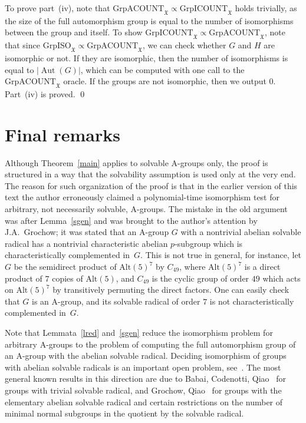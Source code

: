 \documentclass{article}
\DeclareMathOperator{\Aut}{Aut}
\newcommand{\X}{\mathfrak{X}}
\begin{document}
To prove part~(iv), note that \( \mathrm{GrpACOUNT}_\X \propto \mathrm{GrpICOUNT}_\X \) holds trivially,
as the size of the full automorphism group is equal to the number of isomorphisms between the group and itself.
To show \( \mathrm{GrpICOUNT}_\X \propto \mathrm{GrpACOUNT}_\X \), note that since \( \mathrm{GrpISO}_\X \propto \mathrm{GrpACOUNT}_\X \),
we can check whether \( G \) and \( H \) are isomorphic or not. If they are isomorphic, then the number of isomorphisms
is equal to \( |\Aut(G)| \), which can be computed with one call to the \( \mathrm{GrpACOUNT}_\X \) oracle. If the groups are not isomorphic,
then we output \( 0 \). Part~(iv) is proved. \qed

\section{Final remarks}\label{secFinal}

Although Theorem~\ref{main} applies to solvable A-groups only, the proof is structured in a way that the solvability assumption
is used only at the very end. The reason for such organization of the proof is that in the earlier version of this text the author erroneously
claimed a polynomial-time isomorphism test for arbitrary, not necessarily solvable, A-groups. The mistake in the old argument was after Lemma~\ref{sgen}
and was brought to the author's attention by J.A.~Grochow; it was stated that an A-group \( G \) with a nontrivial abelian solvable radical has
a nontrivial characteristic abelian \( p \)-subgroup which is characteristically complemented
in~\( G \). This is not true in general, for instance, let \( G \) be the semidirect product of \( \mathrm{Alt}(5)^7 \) by \( C_{49} \),
where \( \mathrm{Alt}(5)^7 \) is a direct product of \( 7 \) copies of \( \mathrm{Alt}(5) \), and \( C_{49} \) is the cyclic group of order \( 49 \)
which acts on \( \mathrm{Alt}(5)^7 \) by transitively permuting the direct factors.
One can easily check that \( G \) is an A-group, and its solvable radical of order \( 7 \) is not characteristically complemented in~\( G \).

Note that Lemmata~\ref{lred} and~\ref{sgen} reduce the isomorphism problem for arbitrary A-groups to the problem of computing
the full automorphism group of an A-group with the abelian solvable radical. Deciding isomorphism of groups with abelian solvable radicals
is an important open problem, see~\cite[Open Problem~8.1]{grochow}. The most general known results in this direction are due to
Babai, Codenotti, Qiao~\cite{trivrad} for groups with trivial solvable radical, and Grochow, Qiao~\cite{grochow} for groups with the elementary abelian
solvable radical and certain restrictions on the number of minimal normal subgroups in the quotient by the solvable radical.
\end{document}

